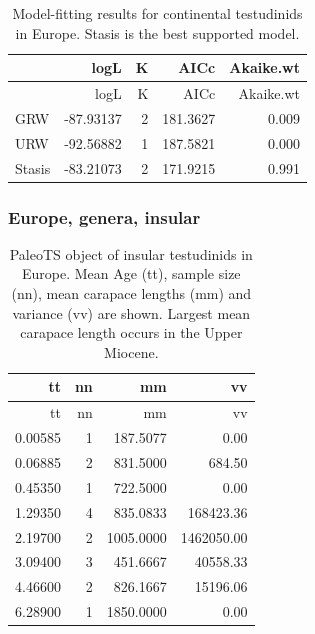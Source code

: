 \begin{longtable}[]{@{}lrrrr@{}}
	\caption[Model fits for continental \T in Europe]{Model-fitting results for continental testudinids in Europe. Stasis is the best supported model.}
	\label{tab:pTSEuCEM}\tabularnewline
	\toprule
	& logL & K & AICc & Akaike.wt\tabularnewline
	\midrule
	\endfirsthead
	\toprule
	& logL & K & AICc & Akaike.wt\tabularnewline
	\midrule
	\endhead
	GRW & -87.93137 & 2 & 181.3627 & 0.009\tabularnewline
	URW & -92.56882 & 1 & 187.5821 & 0.000\tabularnewline
	Stasis & -83.21073 & 2 & 171.9215 & 0.991\tabularnewline
	\bottomrule
\end{longtable}


\FloatBarrier



\subsubsection*{Europe, genera,
	insular}\label{europe-genera-insular}

\begin{longtable}[]{@{}rrrr@{}}
	\caption[PaleoTS object of insular \T in Europe]{PaleoTS object of insular testudinids in Europe. Mean Age (tt), sample size (nn), mean carapace lengths (mm) and variance (vv) are shown. Largest mean carapace length occurs in the Upper Miocene.}
	\label{tab:pTSEuI}\tabularnewline
	\toprule
	tt & nn & mm & vv\tabularnewline
	\midrule
	\endfirsthead
	\toprule
	tt & nn & mm & vv\tabularnewline
	\midrule
	\endhead
	0.00585 & 1 & 187.5077 & 0.00\tabularnewline
	0.06885 & 2 & 831.5000 & 684.50\tabularnewline
	0.45350 & 1 & 722.5000 & 0.00\tabularnewline
	1.29350 & 4 & 835.0833 & 168423.36\tabularnewline
	2.19700 & 2 & 1005.0000 & 1462050.00\tabularnewline
	3.09400 & 3 & 451.6667 & 40558.33\tabularnewline
	4.46600 & 2 & 826.1667 & 15196.06\tabularnewline
	6.28900 & 1 & 1850.0000 & 0.00\tabularnewline
	\bottomrule
\end{longtable}

